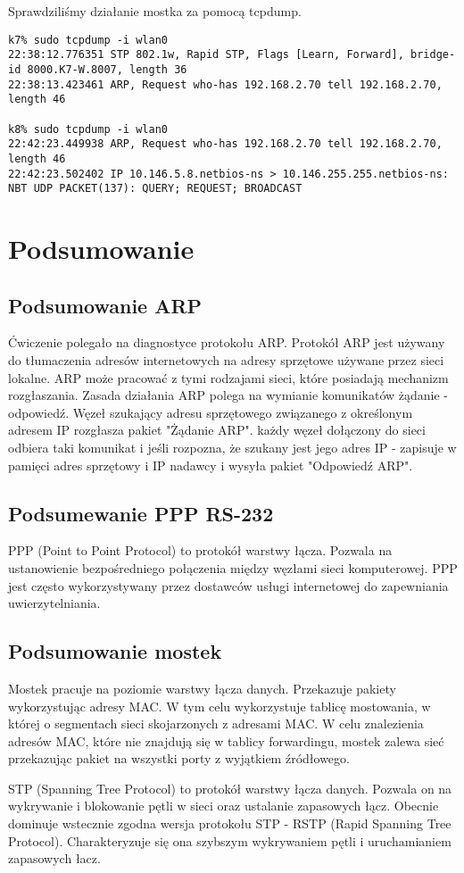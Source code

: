 \documentclass[a4paper,11pt,notitlepage]{article}
\begin{document}
Sprawdziliśmy działanie mostka za pomocą tcpdump.

\begin{verbatim}
k7% sudo tcpdump -i wlan0
22:38:12.776351 STP 802.1w, Rapid STP, Flags [Learn, Forward], bridge-id 8000.K7-W.8007, length 36
22:38:13.423461 ARP, Request who-has 192.168.2.70 tell 192.168.2.70, length 46

k8% sudo tcpdump -i wlan0
22:42:23.449938 ARP, Request who-has 192.168.2.70 tell 192.168.2.70, length 46
22:42:23.502402 IP 10.146.5.8.netbios-ns > 10.146.255.255.netbios-ns: NBT UDP PACKET(137): QUERY; REQUEST; BROADCAST
\end{verbatim}


\section{Podsumowanie}
\subsection{Podsumowanie ARP}
Ćwiczenie polegało na diagnostyce protokołu ARP. Protokół ARP jest 
używany do tłumaczenia adresów internetowych na
adresy sprzętowe używane przez sieci lokalne. ARP może pracować z tymi 
rodzajami sieci, które posiadają mechanizm rozgłaszania.
Zasada działania ARP polega na wymianie komunikatów żądanie - odpowiedź. 
Węzeł szukający adresu sprzętowego związanego
z określonym adresem IP rozgłasza pakiet "Żądanie ARP". każdy węzeł 
dołączony do sieci odbiera taki komunikat i jeśli rozpozna,
że szukany jest jego adres IP - zapisuje w pamięci adres sprzętowy i IP 
nadawcy i wysyła pakiet "Odpowiedź ARP".



\subsection{Podsumewanie PPP RS-232}
PPP (Point to Point Protocol) to protokół warstwy łącza. Pozwala na ustanowienie bezpośredniego połączenia między węzłami sieci komputerowej. PPP jest często wykorzystywany przez dostawców usługi internetowej do zapewniania uwierzytelniania.

\subsection{Podsumowanie mostek}
Mostek pracuje na poziomie warstwy łącza danych. Przekazuje pakiety wykorzystując adresy MAC. W tym celu wykorzystuje tablicę mostowania, w której o segmentach sieci skojarzonych z adresami MAC. W celu znalezienia adresów MAC, które nie znajdują się w tablicy forwardingu, mostek zalewa sieć przekazując pakiet na wszystki porty z wyjątkiem źródłowego.

STP (Spanning Tree Protocol) to protokół warstwy łącza danych. Pozwala on na wykrywanie i blokowanie pętli w sieci oraz ustalanie zapasowych łącz. Obecnie dominuje wstecznie zgodna wersja protokołu STP - RSTP (Rapid Spanning Tree Protocol). Charakteryzuje się ona szybszym wykrywaniem pętli i uruchamianiem zapasowych łacz.
\end{document}
